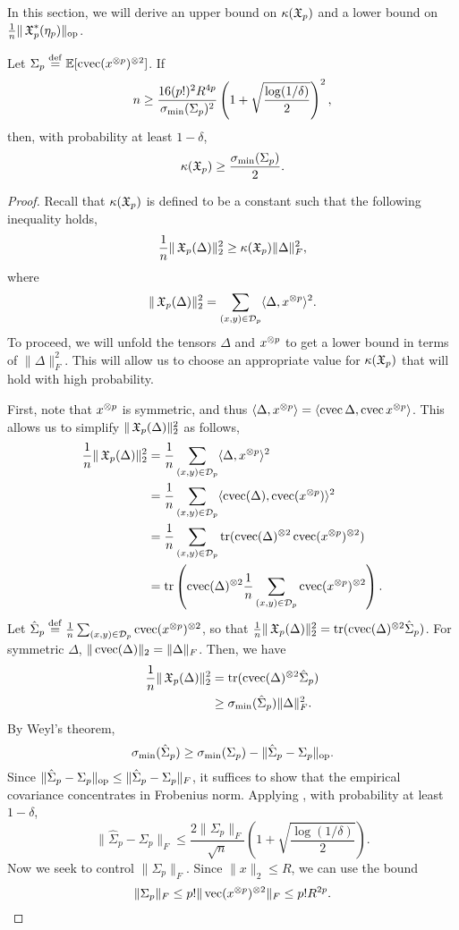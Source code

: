

In this section, we will derive an upper bound on $\kappa(\operatorname{\mathfrak{X}}_p)$ and
a lower bound on $\frac{1}{n} \| \operatorname{\mathfrak{X}}_p^*(\eta_p) \|_{\text{\rm op}}$.

\begin{lemma}
\label{lem:lowRankLower}
Let $\Sigma_p \stackrel{\rm def}{=} \operatorname{\mathbb{E}}[\operatorname{cvec}(x^{\otimes p})^{\otimes 2}]$.
If $$n \ge \frac{16 (p!)^2 R^{4p}}{\sigma_\text{\rm min}(\Sigma_p)^2} \left(1 + \sqrt{\frac{\log(1/\delta)}{2}}\right)^2,$$
then, with probability at least $1-\delta$,
$$\kappa(\operatorname{\mathfrak{X}}_p) \ge \frac{\sigma_\text{\rm min}(\Sigma_p)}{2}.$$
\end{lemma}

\begin{proof}
  Recall that $\kappa(\operatorname{\mathfrak{X}}_p)$ is defined to be a constant such that the following inequality holds, 
  $$\frac{1}{n} \|\operatorname{\mathfrak{X}}_p(\Delta)\|_2^2 \ge \kappa(\operatorname{\mathfrak{X}}_p) \|\Delta\|^2_F,$$
where
$$\|\operatorname{\mathfrak{X}}_p(\Delta)\|_2^2 = \sum_{(x,y) \in \mathcal{D}_p} \langle \Delta, x^{\otimes p} \rangle^2.$$
To proceed, we will unfold the tensors $\Delta$ and $x^{\otimes p}$ to get a lower bound in terms of $\|\Delta\|^2_F$. This will allow us to choose an appropriate value for $\kappa(\operatorname{\mathfrak{X}}_p)$ that will hold with high probability.

First, note that $x^{\otimes p}$ is symmetric, and thus
$\langle \Delta, x^{\otimes p} \rangle = \langle \operatorname{cvec}{\Delta}, \operatorname{cvec}{x^{\otimes p}} \rangle$.
This allows us to simplify $\|\operatorname{\mathfrak{X}}_p(\Delta)\|_2^2$ as follows,
\begin{align*}
  \frac{1}{n} \|\operatorname{\mathfrak{X}}_p(\Delta)\|_2^2 
    &= \frac{1}{n} \sum_{(x,y) \in \mathcal{D}_p} \langle \Delta, x^{\otimes p} \rangle^2 \\
    &= \frac{1}{n} \sum_{(x,y) \in \mathcal{D}_p} \langle \operatorname{cvec}(\Delta), \operatorname{cvec}(x^{\otimes p}) \rangle^2 \\
    &= \frac{1}{n} \sum_{(x,y) \in \mathcal{D}_p} \operatorname{tr}( \operatorname{cvec}(\Delta)^{\otimes 2} \operatorname{cvec}(x^{\otimes p})^{\otimes 2} ) \\
    &= \operatorname{tr}\left( \operatorname{cvec}(\Delta)^{\otimes 2} \frac{1}{n} \sum_{(x,y) \in \mathcal{D}_p} \operatorname{cvec}(x^{\otimes p})^{\otimes 2} \right).
\end{align*}
Let $\hat\Sigma_p \stackrel{\rm def}{=} \frac{1}{n}
\sum_{(x,y) \in \mathcal{D}_p} \operatorname{cvec}(x^{\otimes p})^{\otimes 2}$, so that $\frac{1}{n}
\|\operatorname{\mathfrak{X}}_p(\Delta)\|_2^2 = \operatorname{tr}(\operatorname{cvec}(\Delta)^{\otimes 2} \hat\Sigma_p)$. 
For symmetric $\Delta$, $\|\operatorname{cvec}(\Delta)\|_2 = \|\Delta\|_F$. 
Then, we have 
\begin{align*}
\frac{1}{n} \|\operatorname{\mathfrak{X}}_p(\Delta)\|_2^2 
  &= \operatorname{tr}(\operatorname{cvec}(\Delta)^{\otimes 2} \hat\Sigma_p) \\
  &\ge \sigma_\text{\rm min}(\hat\Sigma_p) \|\Delta\|_F^2.
\end{align*}
By Weyl's theorem, $$\sigma_\text{\rm min}(\hat\Sigma_p) \ge
\sigma_\text{\rm min}(\Sigma_p) - \|\hat\Sigma_p - \Sigma_p\|_{\textrm{op}}.$$
Since $\|\hat\Sigma_p - \Sigma_p\|_{\textrm{op}} \le \|\hat\Sigma_p - \Sigma_p\|_{F}$,
it suffices to show that the empirical covariance concentrates in Frobenius norm.
Applying , with
probability at least $1 - \delta$, $$\| \hat\Sigma_p - \Sigma_p \|_F
\le \frac{2 \|\Sigma_p\|_F}{\sqrt n} \left( 1 + \sqrt{\frac{\log(1/\delta)}{2}} \right).$$
Now we seek to control $\|\Sigma_p\|_F$.
Since $\|x\|_2 \le R$, we can use the
bound $$\| \Sigma_p \|_F \le p! \| \operatorname{vec}(x^{\otimes p})^{\otimes 2} \|_F \le p! R^{2p}.$$


\end{proof}
